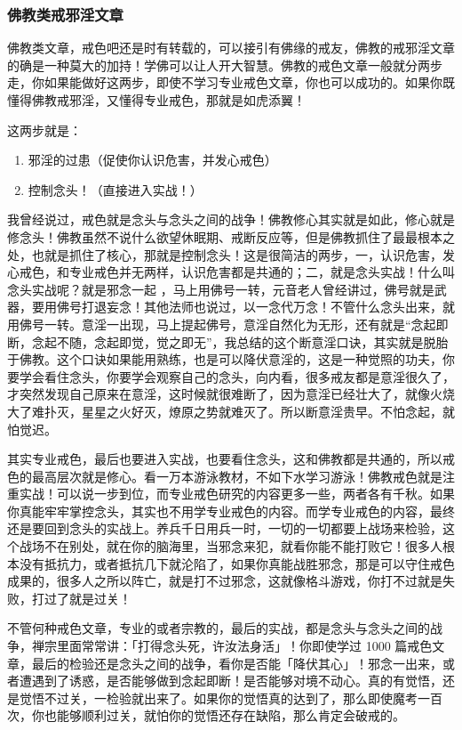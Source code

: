 \documentclass{ctexart}
\begin{document}
\subsubsection{佛教类戒邪淫文章}

佛教类文章，戒色吧还是时有转载的，可以接引有佛缘的戒友，佛教的戒邪淫文章的确是一种莫大的加持！学佛可以让人开大智慧。佛教的戒色文章一般就分两步走，你如果能做好这两步，即使不学习专业戒色文章，你也可以成功的。如果你既懂得佛教戒邪淫，又懂得专业戒色，那就是如虎添翼！

这两步就是：

\begin{enumerate}
    \item 邪淫的过患（促使你认识危害，并发心戒色）
    \item 控制念头！（直接进入实战！）
\end{enumerate}

我曾经说过，戒色就是念头与念头之间的战争！佛教修心其实就是如此，修心就是修念头！佛教虽然不说什么欲望休眠期、戒断反应等，但是佛教抓住了最最根本之处，也就是抓住了核心，那就是控制念头！这是很简洁的两步，一，认识危害，发心戒色，和专业戒色并无两样，认识危害都是共通的；二，就是念头实战！什么叫念头实战呢？就是邪念一起 ，马上用佛号一转，元音老人曾经讲过，佛号就是武器，要用佛号打退妄念！其他法师也说过，以一念代万念！不管什么念头出来，就用佛号一转。意淫一出现，马上提起佛号，意淫自然化为无形，还有就是“念起即断，念起不随，念起即觉，觉之即无”，我总结的这个断意淫口诀，其实就是脱胎于佛教。这个口诀如果能用熟练，也是可以降伏意淫的，这是一种觉照的功夫，你要学会看住念头，你要学会观察自己的念头，向内看，很多戒友都是意淫很久了，才突然发现自己原来在意淫，这时候就很难断了，因为意淫已经壮大了，就像火烧大了难扑灭，星星之火好灭，燎原之势就难灭了。所以断意淫贵早。不怕念起，就怕觉迟。

其实专业戒色，最后也要进入实战，也要看住念头，这和佛教都是共通的，所以戒色的最高层次就是修心。看一万本游泳教材，不如下水学习游泳！佛教戒色就是注重实战！可以说一步到位，而专业戒色研究的内容更多一些，两者各有千秋。如果你真能牢牢掌控念头，其实也不用学专业戒色的内容。而学专业戒色的内容，最终还是要回到念头的实战上。养兵千日用兵一时，一切的一切都要上战场来检验，这个战场不在别处，就在你的脑海里，当邪念来犯，就看你能不能打败它！很多人根本没有抵抗力，或者抵抗几下就沦陷了，如果你真能战胜邪念，那是可以守住戒色成果的，很多人之所以阵亡，就是打不过邪念，这就像格斗游戏，你打不过就是失败，打过了就是过关！

不管何种戒色文章，专业的或者宗教的，最后的实战，都是念头与念头之间的战争，禅宗里面常常讲：「打得念头死，许汝法身活」！你即使学过 1000 篇戒色文章，最后的检验还是念头之间的战争，看你是否能「降伏其心」！邪念一出来，或者遭遇到了诱惑，是否能够做到念起即断！是否能够对境不动心。真的有觉悟，还是觉悟不过关，一检验就出来了。如果你的觉悟真的达到了，那么即使魔考一百次，你也能够顺利过关，就怕你的觉悟还存在缺陷，那么肯定会破戒的。
\end{document}
